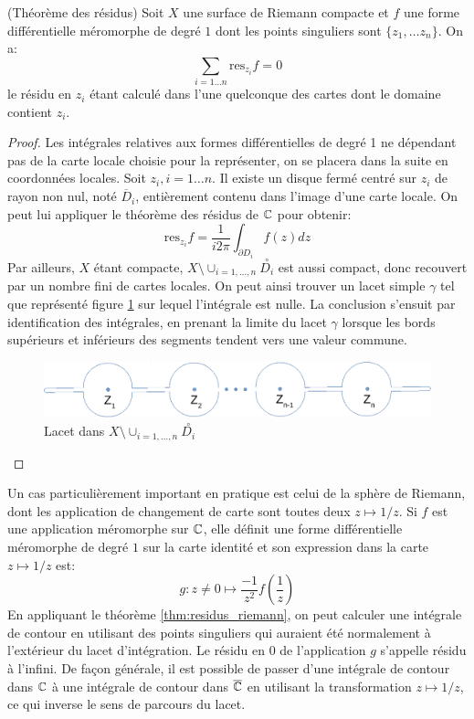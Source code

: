 \begin{theorem}{(Théorème des résidus)}
\label{thm:residus_riemann}
Soit $X$ une surface de Riemann compacte et $f$ une forme différentielle méromorphe de degré $1$ dont les points singuliers sont $\{z_1,\dots z_n\}$. On a:
\[
\sum_{i=1\dots n} \text{res}_{z_i} f  = 0
\]
le résidu en $z_i$ étant calculé dans l'une quelconque des cartes dont le domaine contient $z_i$.
\end{theorem}
\begin{proof}
Les intégrales relatives aux formes différentielles de degré 1 ne dépendant pas de la carte locale choisie pour la représenter, on se placera dans la suite en coordonnées locales. Soit $z_i, i=1\dots n$. Il existe un disque fermé centré sur $z_i$ de rayon non nul, noté $\overline{D}_i$, entièrement contenu dans l'image d'une carte locale. On peut lui appliquer le théorème des résidus de $\mathbb{C}$ pour obtenir:
\[
\text{res}_{z_i}f = \frac{1}{i 2\pi} \int_{\partial D_i} f(z) dz
\]
Par ailleurs, $X$ étant compacte, $X \setminus \cup_{i=1,\dots,n} \stackrel{\circ}{D_i}$ est aussi compact, donc recouvert par un nombre fini de cartes locales. On peut ainsi trouver un lacet simple $\gamma$ tel que représenté figure \ref{fig:lacet_riemann_compact} sur lequel l'intégrale est nulle. La conclusion s'ensuit par identification des intégrales, en prenant la limite du lacet $\gamma$ lorsque les bords supérieurs et inférieurs des segments tendent vers une valeur commune.
\begin{figure}[ht]
    \centering
    \includegraphics[scale=0.4]{images/lacet_compact.pdf}
    \caption{Lacet dans $X \setminus \cup_{i=1,\dots,n} \stackrel{\circ}{D_i}$}
    \label{fig:lacet_riemann_compact}
\end{figure}
\end{proof}

Un cas particulièrement important en pratique est celui de la sphère de Riemann, dont les application de changement de carte sont toutes deux $z \mapsto 1/z$. Si $f$ est une application méromorphe sur $\mathbb{C}$, elle définit une forme différentielle méromorphe de degré $1$ sur la carte identité et son expression dans la carte $z \mapsto 1/z$ est:
\[
g \colon z \neq 0 \mapsto \frac{-1}{z^2}f\left(\frac{1}{z}\right)
\]
En appliquant le théorème \ref{thm:residus_riemann}, on peut calculer une intégrale de contour en utilisant des points singuliers qui auraient été normalement à l'extérieur du lacet d'intégration. Le résidu en $0$ de l'application $g$ s'appelle résidu à l'infini. De façon générale, il est possible de passer d'une intégrale de contour dans $\mathbb{C}$ à une intégrale de contour dans $\overline{\mathbb{C}}$ en utilisant la transformation $z\mapsto 1/z$, ce qui inverse le sens de parcours du lacet. 
